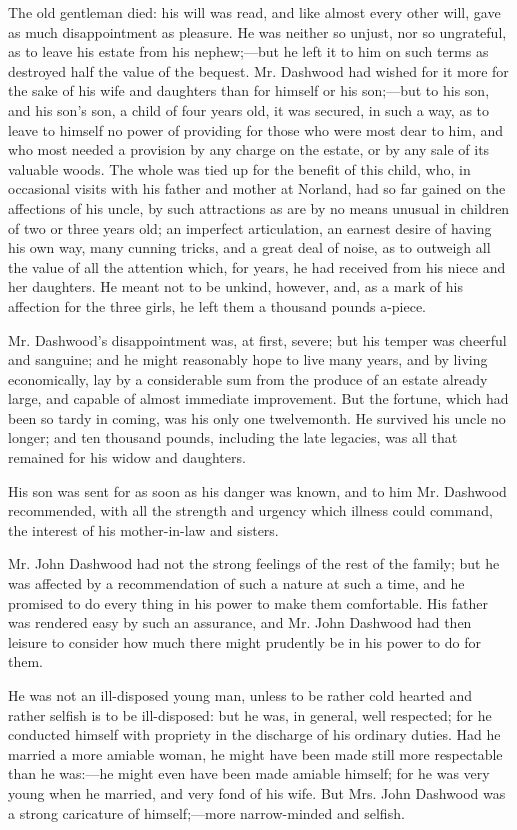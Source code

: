 The old gentleman died: his will was read, and like almost every other will, gave as much disappointment as pleasure. He was neither so unjust, nor so ungrateful, as to leave his estate from his nephew;---but he left it to him on such terms as destroyed half the value of the bequest. Mr. Dashwood had wished for it more for the sake of his wife and daughters than for himself or his son;---but to his son, and his son's son, a child of four years old, it was secured, in such a way, as to leave to himself no power of providing for those who were most dear to him, and who most needed a provision by any charge on the estate, or by any sale of its valuable woods. The whole was tied up for the benefit of this child, who, in occasional visits with his father and mother at Norland, had so far gained on the affections of his uncle, by such attractions as are by no means unusual in children of two or three years old; an imperfect articulation, an earnest desire of having his own way, many cunning tricks, and a great deal of noise, as to outweigh all the value of all the attention which, for years, he had received from his niece and her daughters. He meant not to be unkind, however, and, as a mark of his affection for the three girls, he left them a thousand pounds a-piece.

Mr. Dashwood's disappointment was, at first, severe; but his temper was cheerful and sanguine; and he might reasonably hope to live many years, and by living economically, lay by a considerable sum from the produce of an estate already large, and capable of almost immediate improvement. But the fortune, which had been so tardy in coming, was his only one twelvemonth. He survived his uncle no longer; and ten thousand pounds, including the late legacies, was all that remained for his widow and daughters.

His son was sent for as soon as his danger was known, and to him Mr. Dashwood recommended, with all the strength and urgency which illness could command, the interest of his mother-in-law and sisters.

Mr. John Dashwood had not the strong feelings of the rest of the family; but he was affected by a recommendation of such a nature at such a time, and he promised to do every thing in his power to make them comfortable. His father was rendered easy by such an assurance, and Mr. John Dashwood had then leisure to consider how much there might prudently be in his power to do for them.

He was not an ill-disposed young man, unless to be rather cold hearted and rather selfish is to be ill-disposed: but he was, in general, well respected; for he conducted himself with propriety in the discharge of his ordinary duties. Had he married a more amiable woman, he might have been made still more respectable than he was:---he might even have been made amiable himself; for he was very young when he married, and very fond of his wife. But Mrs. John Dashwood was a strong caricature of himself;---more narrow-minded and selfish.

